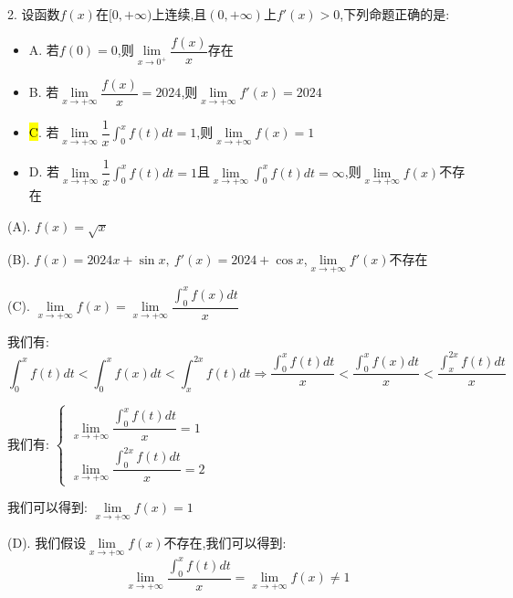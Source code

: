 2. 设函数$f(x)$在$[0,+\infty)$上连续,且$(0,+\infty)$上$f'(x)>0$,下列命题正确的是:  
\begin{itemize}
	\item A. 若$f(0)=0$,则$\lim\limits_{x\rightarrow 0^{+}}\dfrac{f(x)}{x}$存在
	\item B. 若$\lim\limits_{x\rightarrow+\infty}\dfrac{f(x)}{x}=2024$,则$\lim\limits_{x\rightarrow +\infty}f'(x)=2024$
	\item \hl{C}. 若$\lim\limits_{x\rightarrow+\infty}\dfrac{1}{x}\int_{0}^{x}f(t)dt=1$,则$\lim\limits_{x\rightarrow +\infty}f(x)=1$
	\item D. 若$\lim\limits_{x\rightarrow+\infty}\dfrac{1}{x}\int_{0}^{x}f(t)dt=1$且$\lim\limits_{x\rightarrow+\infty}\int_{0}^{x}f(t)dt=\infty$,则$\lim\limits_{x\rightarrow+\infty}f(x)$不存在
\end{itemize}
\begin{solution}

	(A). $f(x)=\sqrt{x}$
	
	(B). $f(x)=2024x+\sin x,\ f'(x)=2024+\cos x$,$\lim\limits_{x\rightarrow +\infty}f'(x)\text{不存在}$
	
	(C). $\lim\limits_{x\rightarrow +\infty}f(x)=\lim\limits_{x\rightarrow+\infty}\dfrac{\int_{0}^{x}f(x)dt}{x}$
	
	我们有:  $$\int_{0}^{x}f(t)dt<\int_{0}^{x}f(x)dt<\int_{x}^{2x}f(t)dt\Rightarrow \dfrac{\int_{0}^{x}f(t)dt}{x}<\dfrac{\int_{0}^{x}f(x)dt}{x}<\dfrac{\int_{x}^{2x}f(t)dt}{x}$$
	
	我们有:  $\left\lbrace
	\begin{array}{l}
		\lim\limits_{x\rightarrow+\infty}\dfrac{\int_{0}^{x}f(t)dt}{x}=1\\
		\lim\limits_{x\rightarrow+\infty}\dfrac{\int_{0}^{2x}f(t)dt}{x}=2
	\end{array}
	\right. $
	
	我们可以得到:  $\lim\limits_{x\rightarrow +\infty}f(x)=1$
	
	(D). 我们假设$\lim\limits_{x\rightarrow +\infty}f(x)$不存在,我们可以得到:  
	$$\lim\limits_{x\rightarrow +\infty}\dfrac{\int_{0}^{x}f(t)dt}{x}=\lim\limits_{x\rightarrow+\infty}f(x)\neq 1$$
	
\end{solution}

